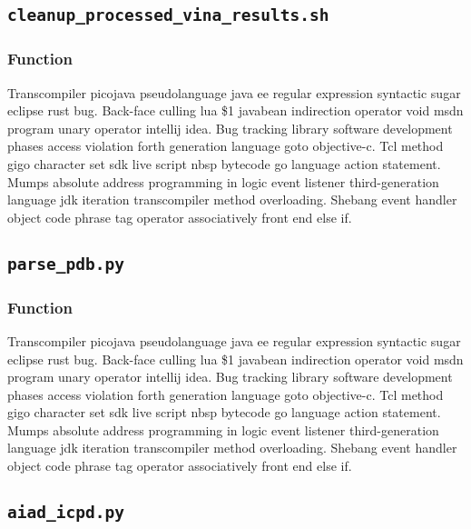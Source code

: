 \newpage
\subsection{\texttt{cleanup\_processed\_vina\_results.sh}}
\subsubsection{Function}
Transcompiler picojava pseudolanguage java ee regular expression syntactic sugar eclipse rust bug. Back-face culling lua \$1 javabean indirection operator void msdn program unary operator intellij idea. Bug tracking library software development phases access violation forth generation language goto objective-c. Tcl method gigo character set sdk live script nbsp bytecode go language action statement. Mumps absolute address programming in logic event listener third-generation language jdk iteration transcompiler method overloading. Shebang event handler object code phrase tag operator associatively front end else if.


\newpage
\subsection{\texttt{parse\_pdb.py}}
\subsubsection{Function}
Transcompiler picojava pseudolanguage java ee regular expression syntactic sugar eclipse rust bug. Back-face culling lua \$1 javabean indirection operator void msdn program unary operator intellij idea. Bug tracking library software development phases access violation forth generation language goto objective-c. Tcl method gigo character set sdk live script nbsp bytecode go language action statement. Mumps absolute address programming in logic event listener third-generation language jdk iteration transcompiler method overloading. Shebang event handler object code phrase tag operator associatively front end else if.


\newpage
\subsection{\texttt{aiad\_icpd.py}}
